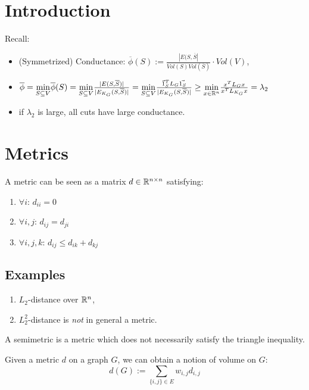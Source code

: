 \documentclass[11pt]{article}
\begin{document}

\section*{Introduction}
Recall:
\begin{itemize}
    \item (Symmetrized) Conductance: $\overline{\phi}(S) := \frac{|E(S,\overline{S}|}{Vol(S)Vol(\overline{S})} \cdot Vol(V)$,
    \item $\overline{\phi} = \underset{S \subseteq V}{\min} \overline{\phi}(S)= \underset{S \subseteq V}{\min}\frac{|E(S,\overline{S})|}{|E_{K_G}(S,\overline{S})|} = \underset{S \subseteq V}{\min}\frac{\vec{1}^T_S L_G\vec{1_S}}{|E_{K_G}(S,\overline{S})|} \geq \underset{x\in \mathbb{R}^n
    }{\min}\frac{x^TL_Gx}{x^TL_{K_G}x} =\lambda_2$ 
    \item if $\lambda_2$ is large, all cuts have large conductance.
\end{itemize}

\section*{Metrics}
\begin{definition}[Metric]
A metric can be seen as a matrix $d \in \mathbb{R}^{n \times n}$ satisfying:
\begin{enumerate}
    \item $\forall i$: $d_{ii} =0$
    \item $\forall i,j$: $d_{ij} =d_{ji}$
    \item $\forall i,j,k$:  $d_{ij} \leq d_{ik} + d_{kj}$
\end{enumerate}
\end{definition}
\subsection*{Examples}
\begin{enumerate}
    \item $L_2$-distance over $\mathbb{R}^n$,
    \item $L_2^2$-distance is \emph{not} in general a metric.
\end{enumerate}

\begin{definition}[Semimetric]
A semimetric is a metric which does not necessarily satisfy the triangle inequality.
\end{definition}
Given a metric $d$ on a graph $G$, we can obtain a notion of volume on $G$:
\[
    d(G):= \sum_{\{i,j\}\in E} w_{i,j} d_{i,j}
\]
\end{document}
